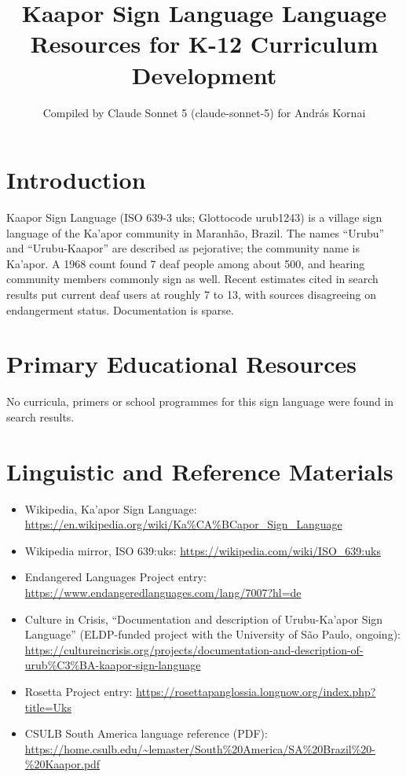 \documentclass[12pt]{article}
\title{Kaapor Sign Language Language Resources for K-12 Curriculum Development}
\author{Compiled by Claude Sonnet 5 (claude-sonnet-5) for Andr\'as Kornai}
\date{}
\begin{document}
\maketitle

\section{Introduction}
Kaapor Sign Language (ISO 639-3 uks; Glottocode urub1243) is a village sign language of the Ka'apor community in Maranh\~ao, Brazil. The names ``Urubu'' and ``Urubu-Kaapor'' are described as pejorative; the community name is Ka'apor. A 1968 count found 7 deaf people among about 500, and hearing community members commonly sign as well. Recent estimates cited in search results put current deaf users at roughly 7 to 13, with sources disagreeing on endangerment status. Documentation is sparse.

\section{Primary Educational Resources}
No curricula, primers or school programmes for this sign language were found in search results.

\section{Linguistic and Reference Materials}
\begin{itemize}
\item Wikipedia, Ka'apor Sign Language: \url{https://en.wikipedia.org/wiki/Ka%CA%BCapor_Sign_Language}
\item Wikipedia mirror, ISO 639:uks: \url{https://wikipedia.com/wiki/ISO_639:uks}
\item Endangered Languages Project entry: \url{https://www.endangeredlanguages.com/lang/7007?hl=de}
\item Culture in Crisis, ``Documentation and description of Urubu-Ka'apor Sign Language'' (ELDP-funded project with the University of S\~ao Paulo, ongoing): \url{https://cultureincrisis.org/projects/documentation-and-description-of-urub%C3%BA-kaapor-sign-language}
\item Rosetta Project entry: \url{https://rosettapanglossia.longnow.org/index.php?title=Uks}
\item CSULB South America language reference (PDF): \url{https://home.csulb.edu/~lemaster/South%20America/SA%20Brazil%20-%20Kaapor.pdf}
\end{itemize}
\end{document}
